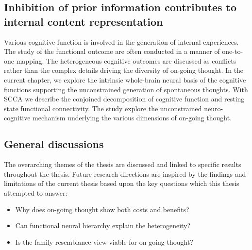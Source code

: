 \subsection*{Inhibition of prior information contributes to internal content representation}
Various cognitive function is involved in the generation of internal experiences. The study of the functional outcome are often conducted in a manner of one-to-one mapping. The heterogeneous cognitive outcomes are discussed as conflicts rather than the complex details driving the diversity of on-going thought. In the current chapter, we explore the intrinsic whole-brain neural basis of the cognitive functions supporting the unconstrained generation of spontaneous thoughts.  With SCCA we describe the conjoined decomposition of cognitive function and resting state functional connectivity. The study explore the unconstrained neuro-cognitive mechanism underlying the various dimensions of on-going thought.

\subsection*{General discussions}
The overarching themes of the thesis are discussed and linked to specific results throughout the thesis. Future research directions are inspired by the findings and limitations of the current thesis based upon the key questions which this thesis attempted to answer:

\begin{itemize}
    \item Why does on-going thought show both costs and benefits? 
    \item Can functional neural hierarchy explain the heterogeneity?
    \item Is the family resemblance view viable for on-going thought?
\end{itemize}


